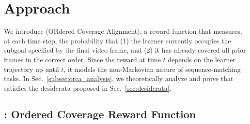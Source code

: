 \section{Approach}
We introduce \ours{} (ORdered Coverage Alignment), a reward function that measures, at each time step, the probability that (1) the learner currently occupies the subgoal specified by the final video frame, and (2) it has already covered all prior frames in the correct order. Since the \orca{} reward at time $t$ depends on the learner trajectory up until $t$, it models the non-Markovian nature of sequence-matching tasks.
In Sec.~\ref{subsec:orca_analysis}, we theoretically analyze and prove that \orca{} satisfies the desiderata proposed in Sec.~\ref{sec:desiderata}.







\subsection{\ours{}: Ordered Coverage Reward Function}



